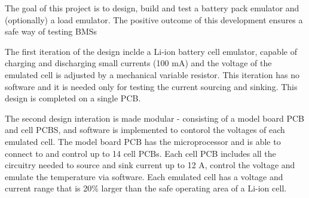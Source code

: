\IEEEPARstart
{T}{he} goal of this project is to design, build and test a battery pack emulator and (optionally)
a load emulator. The positive outcome of this development ensures a safe way of testing BMSs


The first iteration of the design inclde a Li-ion battery cell emulator, capable of charging and discharging small currents (100 mA) and
the voltage of the emulated cell is adjusted by a mechanical variable resistor. This iteration has no software and it is needed only for 
testing the current sourcing and sinking. This design is completed on a single PCB.

The second design interation is made modular - consisting of a model board PCB and cell PCBS, and software is implemented to contorol the 
voltages of each emulated cell. The model board PCB has the microprocessor and is able to connect to and control up to 14 cell PCBs. Each
cell PCB includes all the circuitry needed to source and sink current up to 12 A, control the voltage and emulate the temperature via software.
Each emulated cell has a voltage and current range that is 20\% larger than the safe operating area of a Li-ion cell.





 



